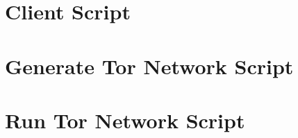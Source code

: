 \documentclass{ecuthesis}
\begin{document}
\section{Client Script}

\label{client-script}


\section{Generate Tor Network Script}

\label{generate-tor-network-script}


\section{Run Tor Network Script}

\label{run-tor-network-script}


\printbibliography[title=REFERENCES]
\end{document}
